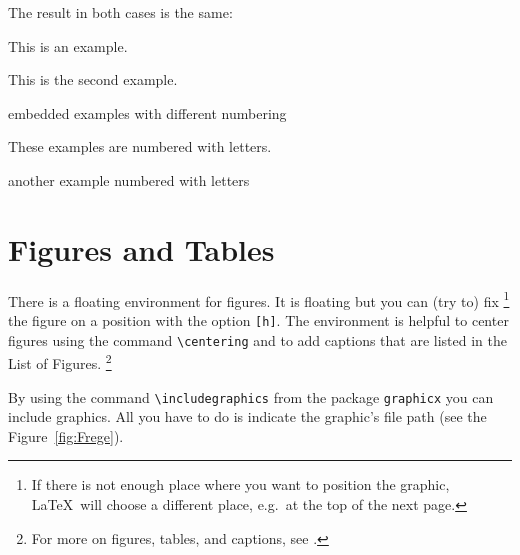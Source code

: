 The result in both cases is the same:

\ea This is an example.

\ex This is the second example.

	\ea embedded examples with different numbering
	
	\ex These examples are numbered with letters.
	
	\ex another example numbered with letters
	\z   
\z


\section{Figures and Tables}
\label{ch:FigTab}


There is a floating environment for figures. It is floating but you can (try to) fix%
	\footnote{If there is not enough place where you want to position the graphic, \LaTeX\ will choose a different place, e.g.\ at the top of the next page.} %
the figure on a position with the option \texttt{[h]}. The environment is helpful to center figures using the command \verb|\centering| and to add captions that are listed in the List of Figures.%
	\footnote{For more on figures, tables, and captions, see \citet{Freitag&MyP15a}.} %

By using the command \verb|\includegraphics| from the package \texttt{graphicx} you can include graphics. All you have to do is indicate the graphic's file path (see the Figure~\ref{fig:Frege}).


